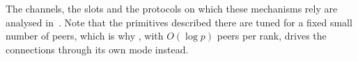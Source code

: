 The channels, the slots and the protocols on which these mechanisms rely are analysed in~\cite{hu2025demystifying}. Note that the primitives described there are tuned for a fixed small number of peers, which is why \pat{}, with $O(\log p)$ peers per rank, drives the connections through its own mode instead.
